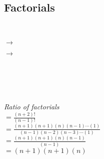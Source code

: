 \documentclass{article}
\begin{document}
    \subsection{\huge Factorials}

        \hrulefill \\[10pt]


            $\rightarrow$


            $\rightarrow$


            \hrulefill \\[10pt]

    \\

    \hrulefill \\[10pt]

    \\[5pt]
    \textit{Ratio of factorials}\\[15pt]

    $=\frac{(n+2)!}{(n-1)!}$\\[15pt]
    
    $= \frac{(n+1)(n+1)(n)(n-1)\cdots(1)}{(n-1)(n-2)(n-3)\cdots(1)}$\\[15pt]
    
    $= \frac{(n+1)(n+1)(n)(n-1)}{(n-1)}$\\[15pt]

    $= {(n+1)(n+1)(n)}$\\[15pt]
\end{document}
